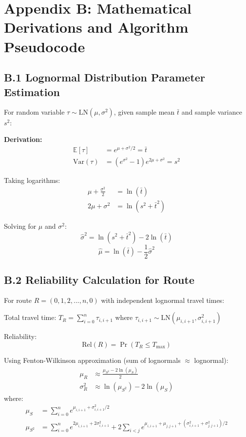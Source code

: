 \section{Appendix B: Mathematical Derivations and Algorithm Pseudocode}

\subsection{B.1 Lognormal Distribution Parameter Estimation}

For random variable $\tau \sim \text{LN}(\mu, \sigma^2)$, given sample mean $\bar{t}$ and sample variance $s^2$:

\textbf{Derivation:}
\begin{align*}
\mathbb{E}[\tau] &= e^{\mu + \sigma^2/2} = \bar{t} \\
\text{Var}(\tau) &= (e^{\sigma^2} - 1)e^{2\mu + \sigma^2} = s^2
\end{align*}

Taking logarithms:
\begin{align*}
\mu + \frac{\sigma^2}{2} &= \ln(\bar{t}) \\
2\mu + \sigma^2 &= \ln(s^2 + \bar{t}^2)
\end{align*}

Solving for $\mu$ and $\sigma^2$:
\begin{equation}
\boxed{\hat{\sigma}^2 = \ln(s^2 + \bar{t}^2) - 2\ln(\bar{t})}
\end{equation}
\begin{equation}
\boxed{\hat{\mu} = \ln(\bar{t}) - \frac{1}{2}\hat{\sigma}^2}
\end{equation}

\subsection{B.2 Reliability Calculation for Route}

For route $R = (0, 1, 2, ..., n, 0)$ with independent lognormal travel times:

Total travel time: $T_R = \sum_{i=0}^n \tau_{i,i+1}$ where $\tau_{i,i+1} \sim \text{LN}(\mu_{i,i+1}, \sigma_{i,i+1}^2)$

Reliability:
\begin{equation}
\text{Rel}(R) = \Pr(T_R \leq T_{\max})
\end{equation}

Using Fenton-Wilkinson approximation (sum of lognormals $\approx$ lognormal):
\begin{align}
\mu_R &\approx \frac{\mu_{S^2} - 2\ln(\mu_S)}{2} \\
\sigma_R^2 &\approx \ln(\mu_{S^2}) - 2\ln(\mu_S)
\end{align}
where:
\begin{align*}
\mu_S &= \sum_{i=0}^n e^{\mu_{i,i+1} + \sigma_{i,i+1}^2/2} \\
\mu_{S^2} &= \sum_{i=0}^n e^{2\mu_{i,i+1} + 2\sigma_{i,i+1}^2} + 2\sum_{i<j} e^{\mu_{i,i+1} + \mu_{j,j+1} + (\sigma_{i,i+1}^2 + \sigma_{j,j+1}^2)/2}
\end{align*}

